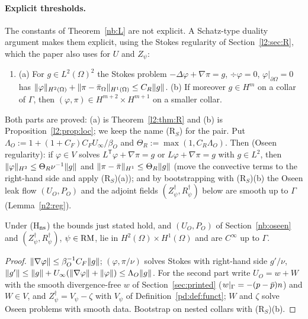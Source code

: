 \paragraph{Explicit thresholds.} The constants of Theorem~\ref{nb:L} are not explicit. A Schatz-type duality argument \cite{Schatz1974} makes them explicit, using the Stokes regularity of Section~\ref{l2:sec:R}, which the paper also uses for $U$ and $Z_\psi$:
\begin{enumerate}
\item[(R$_S$)] (a) For $g\in L^2(\Omega)^2$ the Stokes problem $-\Delta\varphi+\nabla\pi=g$, $\div\varphi=0$, $\varphi|_{\partial\Omega}=0$ has $\lVert \varphi\rVert_{H^2(\Omega)}+\lVert \pi-\bar\pi_\Omega\rVert_{H^1(\Omega)}\le C_R\lVert g\rVert$. (b) If moreover $g\in H^m$ on a collar of $\Gamma$, then $(\varphi,\pi)\in H^{m+2}\times H^{m+1}$ on a smaller collar.
\end{enumerate}
Both parts are proved: (a) is Theorem~\ref{l2:thm:R} and (b) is Proposition~\ref{l2:prop:loc}; we keep the name (R$_S$) for the pair.
Put $\Lambda_O:=1+(1+C_F)C_FU_\infty/\beta_O$ and $\Theta_R:=\max(1,C_R\Lambda_O)$. Then (Oseen regularity): if $\varphi\in V$ solves $L^{\mathsf T}\varphi+\nabla\pi=g$ or $L\varphi+\nabla\pi=g$ with $g\in L^2$, then $\lVert \varphi\rVert_{H^2}\le\Theta_R\nu^{-1}\lVert g\rVert$ and $\lVert \pi-\bar\pi\rVert_{H^1}\le\Theta_R\lVert g\rVert$ (move the convective terms to the right-hand side and apply (R$_S$)(a)); and by bootstrapping with (R$_S$)(b) the Oseen leak flow $(U_O,P_O)$ and the adjoint fields $(Z^\dagger_\psi,R^\dagger_\psi)$ below are smooth up to $\Gamma$ (Lemma~\ref{n2:reg}).

\begin{lemma}\label{n2:reg}
Under (H$_{\rm ns}$) the bounds just stated hold, and $(U_O,P_O)$ of Section~\ref{nb:oseen} and $(Z^\dagger_\psi,R^\dagger_\psi)$, $\psi\in\mathrm{RM}$, lie in $H^2(\Omega)\times H^1(\Omega)$ and are $C^\infty$ up to $\Gamma$.
\end{lemma}

\begin{proof}
$\lVert \nabla\varphi\rVert\le\beta_O^{-1}C_F\lVert g\rVert$; $(\varphi,\pi/\nu)$ solves Stokes with right-hand side $g'/\nu$, $\lVert g'\rVert\le\lVert g\rVert+U_\infty(\lVert \nabla\varphi\rVert+\lVert \varphi\rVert)\le\Lambda_O\lVert g\rVert$. For the second part write $U_O=w+W$ with the smooth divergence-free $w$ of Section~\ref{sec:printed} ($w|_\Gamma=-(p-\bar p)n$) and $W\in V$, and $Z^\dagger_\psi=V_\psi-\zeta$ with $V_\psi$ of Definition~\ref{pd:def:funct}; $W$ and $\zeta$ solve Oseen problems with smooth data. Bootstrap on nested collars with (R$_S$)(b).
\end{proof}

